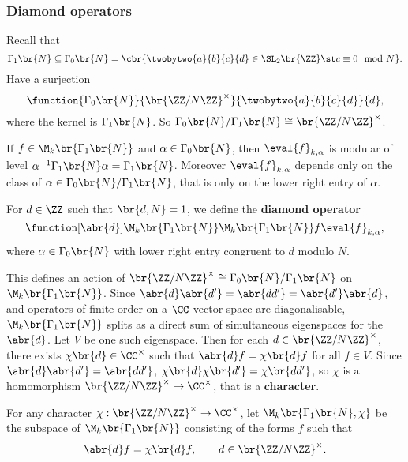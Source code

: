 \subsubsection{Diamond operators}


Recall that
$$ \Gamma_1\br{N} \subseteq \Gamma_0\br{N} = \cbr{\twobytwo{a}{b}{c}{d} \in \SL_2\br{\ZZ} \st c \equiv 0 \mod N}. $$
Have a surjection
$$ \function{\Gamma_0\br{N}}{\br{\ZZ / N\ZZ}^\times}{\twobytwo{a}{b}{c}{d}}{d}, $$
where the kernel is $ \Gamma_1\br{N} $. So $ \Gamma_0\br{N} / \Gamma_1\br{N} \cong \br{\ZZ / N\ZZ}^\times $.

\begin{note*}
If $ f \in \M_k\br{\Gamma_1\br{N}} $ and $ \alpha \in \Gamma_0\br{N} $, then $ \eval{f}_{k, \alpha} $ is modular of level $ \alpha^{-1}\Gamma_1\br{N}\alpha = \Gamma_1\br{N} $. Moreover $ \eval{f}_{k, \alpha} $ depends only on the class of $ \alpha \in \Gamma_0\br{N} / \Gamma_1\br{N} $, that is only on the lower right entry of $ \alpha $.
\end{note*}

\begin{definition}
For $ d \in \ZZ $ such that $ \br{d, N} = 1 $, we define the \textbf{diamond operator}
$$ \function[\abr{d}]{\M_k\br{\Gamma_1\br{N}}}{\M_k\br{\Gamma_1\br{N}}}{f}{\eval{f}_{k, \alpha}}, $$
where $ \alpha \in \Gamma_0\br{N} $ with lower right entry congruent to $ d $ modulo $ N $.
\end{definition}

This defines an action of $ \br{\ZZ / N\ZZ}^\times \cong \Gamma_0\br{N} / \Gamma_1\br{N} $ on $ \M_k\br{\Gamma_1\br{N}} $. Since $ \abr{d}\abr{d'} = \abr{dd'} = \abr{d'}\abr{d} $, and operators of finite order on a $ \CC $-vector space are diagonalisable, $ \M_k\br{\Gamma_1\br{N}} $ splits as a direct sum of simultaneous eigenspaces for the $ \abr{d} $. Let $ V $ be one such eigenspace. Then for each $ d \in \br{\ZZ / N\ZZ}^\times $, there exists $ \chi\br{d} \in \CC^\times $ such that $ \abr{d}f = \chi\br{d}f $ for all $ f \in V $. Since $ \abr{d}\abr{d'} = \abr{dd'} $, $ \chi\br{d}\chi\br{d'} = \chi\br{dd'} $, so $ \chi $ is a homomorphism $ \br{\ZZ / N\ZZ}^\times \to \CC^\times $, that is a \textbf{character}.

\begin{definition}
For any character $ \chi : \br{\ZZ / N\ZZ}^\times \to \CC^\times $, let $ \M_k\br{\Gamma_1\br{N}, \chi} $ be the subspace of $ \M_k\br{\Gamma_1\br{N}} $ consisting of the forms $ f $ such that
$$ \abr{d}f = \chi\br{d}f, \qquad d \in \br{\ZZ / N\ZZ}^\times. $$
\end{definition}

